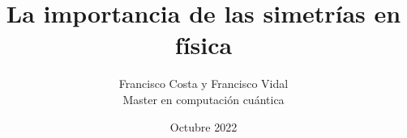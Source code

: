 \documentclass[12pt]{article}
\begin{document}
	\title{La importancia de las simetrías en física}
	\author{Francisco Costa y Francisco Vidal\\
	\small{Master en computación cuántica}}
	\date{Octubre 2022}
	\maketitle
  
	\tableofcontents

	\setlength{\parskip}{\baselineskip}
	
	
	
	
	
	
	
	
	\printbibliography

	\printindex
\end{document}
